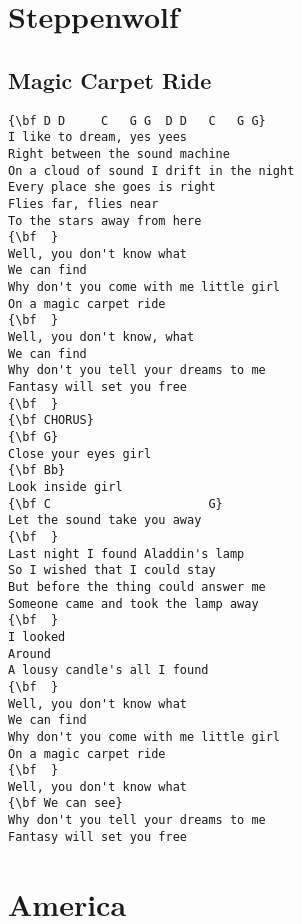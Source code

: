 \documentclass[a4paper]{article}
\begin{document}
\section{Steppenwolf}
\subsection{Magic Carpet Ride}
\begin{multicols}{2}\begin{Verbatim}[commandchars=\\\{\}]
{\bf D D     C   G G  D D   C   G G}
I like to dream, yes yees
Right between the sound machine
On a cloud of sound I drift in the night
Every place she goes is right
Flies far, flies near
To the stars away from here
{\bf  }
Well, you don't know what
We can find
Why don't you come with me little girl
On a magic carpet ride
{\bf  }
Well, you don't know, what
We can find
Why don't you tell your dreams to me
Fantasy will set you free
{\bf  }
{\bf CHORUS}
{\bf G}
Close your eyes girl
{\bf Bb}
Look inside girl
{\bf C                      G}
Let the sound take you away
{\bf  }
Last night I found Aladdin's lamp
So I wished that I could stay
But before the thing could answer me
Someone came and took the lamp away
{\bf  }
I looked
Around
A lousy candle's all I found
{\bf  }
Well, you don't know what
We can find
Why don't you come with me little girl
On a magic carpet ride
{\bf  }
Well, you don't know what
{\bf We can see}
Why don't you tell your dreams to me
Fantasy will set you free

\end{Verbatim}
\end{multicols}\newpage
\section{America}
\end{document}
